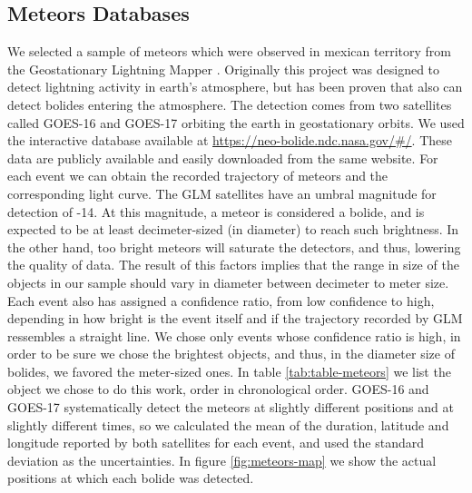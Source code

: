 \subsection{Meteors Databases}
\label{ssec:databases}
We selected a sample of meteors which were observed in mexican territory from the Geostationary Lightning Mapper \citep{GOODMAN:2013}. Originally this project was designed to detect lightning activity in earth's atmosphere, but has been proven that also can detect bolides entering the atmosphere. The detection comes from two satellites called GOES-16 and GOES-17 orbiting the earth in geostationary orbits. %
We used the interactive database available at \url{https://neo-bolide.ndc.nasa.gov/#/}. These data are publicly available and easily downloaded from the same website. For each event we can obtain the recorded trajectory of meteors and the corresponding light curve. The GLM satellites have an umbral magnitude for detection of -14. At this magnitude, a meteor is considered a bolide, and is expected to be at least decimeter-sized (in diameter) to reach such brightness. In the other hand, too bright meteors will saturate the detectors, and thus, lowering the quality of data. The result of this factors implies that the range in size of the objects in our sample should vary in diameter between decimeter to meter size. Each event also has assigned a confidence ratio, from low confidence to high, depending in how bright is the event itself and if the trajectory recorded by GLM ressembles a straight line. We chose only events whose confidence ratio is high, in order to be sure we chose the brightest objects, and thus, in the diameter size of bolides, we favored the meter-sized ones. In table \ref{tab:table-meteors} we list the object we chose to do this work, order in chronological order. %
GOES-16 and GOES-17 systematically detect the meteors at slightly different positions and at slightly different times, so we calculated the mean of the duration, latitude and longitude reported by both satellites for each event, and used the standard deviation as the uncertainties. In figure \ref{fig:meteors-map} we show the actual positions at which each bolide was detected.

